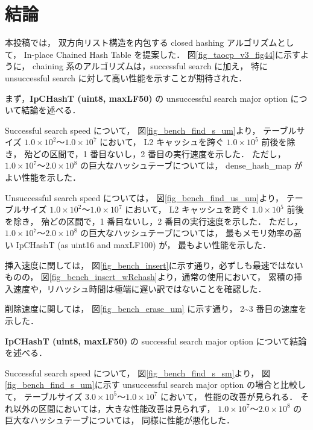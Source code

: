\chapter{結論}
\label{chap_Conclusion}


本投稿では，
双方向リスト構造を内包する closed hashing アルゴリズムとして，
In-place Chained Hash Table を提案した．
図\ref{fig_taocp_v3_fig44}に示すように，
chaining 系のアルゴリズムは，successful search に加え，
特に unsuccessful search に対して高い性能を示すことが期待された．
\newline

まず，{\bf IpCHashT (uint8, maxLF50)} の unsuccessful search major option について結論を述べる．

Successful search speed について，
図\ref{fig_bench_find_s_um}より，
テーブルサイズ $1.0\times10^2〜1.0\times10^7$ において，
L2 キャッシュを跨ぐ $1.0\times10^5$ 前後を除き，
殆どの区間で，1 番目ないし，2 番目の実行速度を示した．
ただし，$1.0\times10^7〜2.0\times10^8$ の巨大なハッシュテーブについては，
dense\_hash\_map がよい性能を示した．

Unsuccessful search speed については，
図\ref{fig_bench_find_us_um}より，
テーブルサイズ $1.0\times10^2〜1.0\times10^7$ において，
L2 キャッシュを跨ぐ $1.0\times10^5$ 前後を除き，
殆どの区間で，1 番目ないし，2 番目の実行速度を示した．
ただし，$1.0\times10^7〜2.0\times10^8$ の巨大なハッシュテーブについては，
最もメモリ効率の高い IpCHashT (as uint16 and maxLF100) が，
最もよい性能を示した．

挿入速度に関しては，
図\ref{fig_bench_insert}に示す通り，必ずしも最速ではないものの，
図\ref{fig_bench_insert_wRehash}より，通常の使用において，
累積の挿入速度や，リハッシュ時間は極端に遅い訳ではないことを確認した．

削除速度に関しては，
図\ref{fig_bench_erase_um} に示す通り，
2\textasciitilde 3 番目の速度を示した．
\newline

{\bf IpCHashT (uint8, maxLF50)} の successful search major option について結論を述べる．

Successful search speed について，
図\ref{fig_bench_find_s_sm}より，
図\ref{fig_bench_find_s_um}に示す unsuccessful search major option の場合と比較して，
テーブルサイズ $3.0\times10^5〜1.0\times10^7$ において，
性能の改善が見られる．
それ以外の区間においては，大きな性能改善は見られず，
$1.0\times10^7〜2.0\times10^8$ の巨大なハッシュテーブについては，
同様に性能が悪化した．

